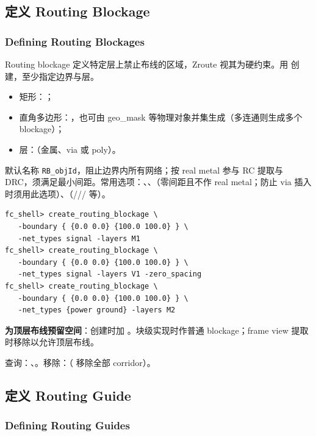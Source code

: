 \subsection{定义 Routing Blockage}
\subsubsection*{Defining Routing Blockages}

Routing blockage 定义特定层上禁止布线的区域，Zroute 视其为硬约束。用  创建，至少指定边界与层。

\begin{itemize}
  \item 矩形：；
  \item 直角多边形：，也可由 geo\_mask 等物理对象并集生成（多连通则生成多个 blockage）；
  \item 层：（金属、via 或 poly）。
\end{itemize}

默认名称 \texttt{RB\_objId}，阻止边界内所有网络；按 real metal 参与 RC 提取与 DRC，须满足最小间距。常用选项：、、（零间距且不作 real metal；防止 via 插入时须用此选项）、（/// 等）。

\begin{lstlisting}
fc_shell> create_routing_blockage \
   -boundary { {0.0 0.0} {100.0 100.0} } \
   -net_types signal -layers M1
fc_shell> create_routing_blockage \
   -boundary { {0.0 0.0} {100.0 100.0} } \
   -net_types signal -layers V1 -zero_spacing
fc_shell> create_routing_blockage \
   -boundary { {0.0 0.0} {100.0 100.0} } \
   -net_types {power ground} -layers M2
\end{lstlisting}

\textbf{为顶层布线预留空间}：创建时加 。块级实现时作普通 blockage；frame view 提取时移除以允许顶层布线。

查询：\cmd{get\_routing\_blockages}、。移除：（ 移除全部 corridor）。

\subsection{定义 Routing Guide}
\subsubsection*{Defining Routing Guides}

